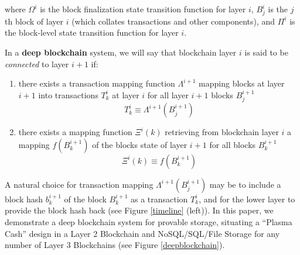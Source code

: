 \documentclass{article}
\newcommand{\block}[2]{B^{#1}_{#2}}
\newcommand{\blockhash}[2]{b^{#1}_{#2}}
\newcommand{\blockfinalizationstatetransition}[1]{\Omega^#1}
\newcommand{\blockstatetransition}[1]{\Pi^#1}
\newcommand{\submission}[1]{\Lambda^{#1}}
\newcommand{\transaction}[2]{T_{#2}^#1}
\newcommand{\retrieval}[1]{\Xi^{#1}}
\begin{document}
\noindent where $\blockfinalizationstatetransition{i}$ is the block finalization state transition function for layer $i$, $\block{i}{j}$ is the $j$th block of layer $i$ (which collates transactions and other components), and $\blockstatetransition{i}$ is the block-level state transition function for layer $i$.  

In a {\bf deep blockchain} system, we will say that blockchain layer $i$ is said to be {\em connected} to layer $i+1$ if: 
\begin{enumerate}
    \item there exists a transaction mapping function $\submission{i+1}$ mapping blocks at layer $i+1$ into transactions $\transaction{i}{k}$ at layer $i$ for all layer $i+1$ blocks $\block{i+1}{j}$
\begin{equation}
\transaction{i}{k} \equiv \submission{i+1}(\block{i+1}{j})
\end{equation}
    \item there exists a mapping function $\retrieval{i}(k)$ retrieving from blockchain layer $i$ a mapping  $f(\block{i+1}{k})$ of the blocks state of layer $i+1$  for all blocks $\block{i+1}{k}$
\begin{equation}
\retrieval{i}(k) \equiv f(\block{i+1}{k})  
\end{equation}
\end{enumerate}
A natural choice for transaction mapping $\submission{i+1}(\block{i+1}{j})$ may be to include a block hash $\blockhash{i+1}{k}$ of the block $\block{i+1}{k}$ as a transaction $\transaction{i}{k}$, and for the lower layer to provide the block hash back (see Figure \ref{timeline} (left)).  In this paper, we demonstrate a deep blockchain system for provable storage, situating a ``Plasma Cash'' design \cite{plasmacashsimplespec} in a Layer 2 Blockchain and NoSQL/SQL/File Storage for any number of Layer 3 Blockchains (see Figure \ref{deepblockchain}).
\end{document}
